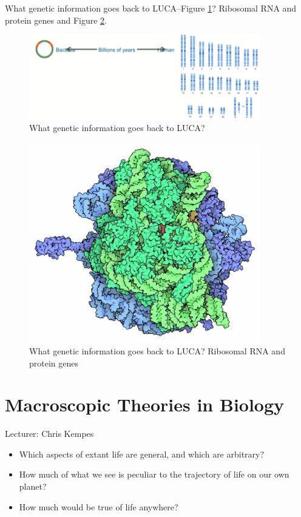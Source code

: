 \documentclass[]{article}
\begin{document}
 What genetic information goes back to LUCA--Figure \ref{fig:back_to_LUCA}? Ribosomal RNA and protein genes\cite{quast2012silva} and Figure \ref{fig:Ribosome-5-3-2}.
 
 \begin{figure}[H]
 	\caption{What genetic information goes back to LUCA? }\label{fig:back_to_LUCA}
 	\includegraphics[width=0.9\textwidth]{LUCA_what_goes_back}
 \end{figure}

\begin{figure}[H]
	\caption{What genetic information goes back to LUCA? Ribosomal RNA and protein genes}\label{fig:Ribosome-5-3-2}
	\includegraphics[width=0.9\textwidth]{Ribosome-5-3-2}
\end{figure}


\section{Macroscopic Theories in Biology}

Lecturer: Chris Kempes

\begin{itemize}
	\item Which aspects of extant life are general, and which are arbitrary?
	\item How much of what we see is peculiar to the trajectory of life on our own planet?
	\item How much would be true of life anywhere?
\end{itemize}
\end{document}
